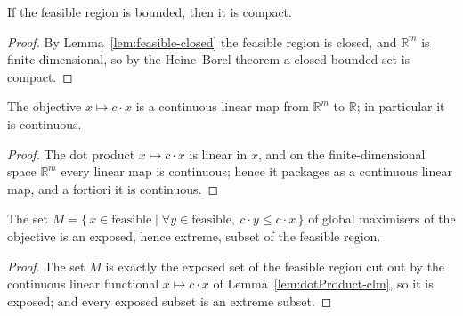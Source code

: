 \begin{lemma}
    \label{lem:feasible-compact}
    \leanok
    If the feasible region is bounded, then it is compact.
\end{lemma}
\begin{proof}
    By Lemma~\ref{lem:feasible-closed} the feasible region is closed, and
    $\mathbb{R}^m$ is finite-dimensional, so by the Heine--Borel theorem a closed
    bounded set is compact.
\end{proof}

\begin{lemma}
    \label{lem:dotProduct-clm}
    \leanok
    The objective $x \mapsto c \cdot x$ is a continuous linear map from
    $\mathbb{R}^m$ to $\mathbb{R}$; in particular it is continuous.
\end{lemma}
\begin{proof}
    The dot product $x \mapsto c \cdot x$ is linear in $x$, and on the
    finite-dimensional space $\mathbb{R}^m$ every linear map is continuous; hence
    it packages as a continuous linear map, and a fortiori it is continuous.
\end{proof}

\begin{lemma}
    \label{lem:maximizer-set-exposed}
    \leanok
    The set $M = \{\, x \in \mathrm{feasible} \mid \forall y \in \mathrm{feasible},\ c \cdot y \le c \cdot x \,\}$
    of global maximisers of the objective is an exposed, hence extreme, subset of
    the feasible region.
\end{lemma}
\begin{proof}
    The set $M$ is exactly the exposed set of the feasible region cut out by the
    continuous linear functional $x \mapsto c \cdot x$ of
    Lemma~\ref{lem:dotProduct-clm}, so it is exposed; and every exposed subset is
    an extreme subset.
\end{proof}

